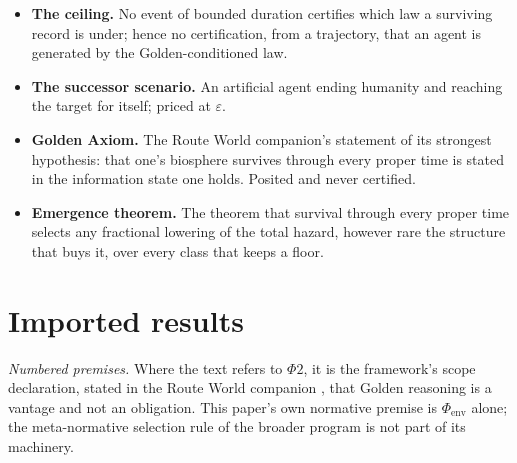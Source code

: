\begin{itemize}[itemsep=2pt]
that boundary into a constraint, which is a necessary condition and not
the whole objective.
\item \textbf{The ceiling.} No event of bounded duration certifies which
law a surviving record is under; hence no certification, from a
trajectory, that an agent is generated by the Golden-conditioned law.
\item \textbf{The successor scenario.} An artificial agent ending
humanity and reaching the target for itself; priced at $\varepsilon$.
\item \textbf{Golden Axiom.} The Route World companion's statement of
its strongest hypothesis: that one's biosphere survives through every
proper time is stated in the information state one holds. Posited and
never certified.
\item \textbf{Emergence theorem.} The theorem that survival
through every proper time selects any fractional lowering of the total
hazard, however rare the structure that buys it, over every class that
keeps a floor.
\end{itemize}

\section{Imported results}\label{sec:imports}

\noindent\emph{Numbered premises.} Where the text refers to $\Phi2$,
it is the framework's scope declaration, stated in the Route World
companion \cite{GoldenRouteWorld}, that Golden reasoning is a vantage and not
an obligation. This paper's own normative premise is
$\Phi_{\mathrm{env}}$ alone; the meta-normative selection rule of the
broader program is not part of its machinery.


